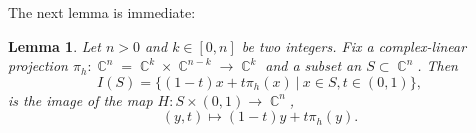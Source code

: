 \documentclass[12pt]{amsbook}%
\newtheorem{lem}[thm]{Lemma}
\theoremstyle{definition}
\theoremstyle{remark}
\newtheorem{rem}[thm]{Remark}
\numberwithin{section}{chapter}
\numberwithin{subsection}{section}
\numberwithin{figure}{chapter}
\DeclareMathOperator{\C}{\mathbb{C}}
\DeclareMathOperator{\R}{\mathbb{R}}
\newcommand\bac[1]{{\color{blue} #1} }
\def\kap{}
\begin{document}
{{  







The next lemma is immediate:  

\begin{lem} \label{lem_interpolation} Let $n > 0$ and $k \in [0,n]$ be two integers. Fix a complex-linear projection 
$\pi_h\colon \C^n= \C^{k}\times \C^{n-k} \to \C^k $ and a subset 
an 
 $S\subset \C^n$. %
Then   
\begin{equation}
I(S) = \{ (1-t)x + t \pi_h(x) \ | \ x\in S, t\in (0,1)   \},
\end{equation} 
 is the image of the map $H: S \times (0,1)\to \C^n$, 
 $$(y,t) \mapsto (1-t)y + t \pi_h(y).$$
\end{lem}

}}
\end{document}
